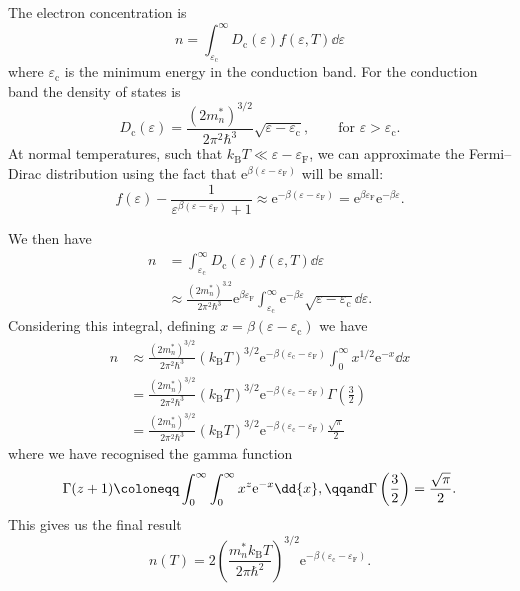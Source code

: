 \documentclass[fleqn]{NotesClass}
\newcommand*{\boltzmann}{k_{\mathrm{B}}}
\newcommand*{\e}{\mathrm{e}}
\newcommand*{\fermi}{\mathrm{F}}
\begin{document}
    The electron concentration is
    \begin{equation}
        n = \int_{\varepsilon_{\mathrm{c}}}^{\infty} D_{\mathrm{c}}(\varepsilon) f(\varepsilon, T) \dd{\varepsilon}
    \end{equation}
    where \(\varepsilon_{\mathrm{c}}\) is the minimum energy in the conduction band.
    For the conduction band the density of states is
    \begin{equation}
        D_{\mathrm{c}}(\varepsilon) = \frac{(2m_n^*)^{3/2}}{2\pi^2\hbar^3}\sqrt{\varepsilon - \varepsilon_{\mathrm{c}}}, \qquad\text{for \(\varepsilon > \varepsilon_{\mathrm{c}}\)}.
    \end{equation}
    At normal temperatures, such that \(\boltzmann T \ll \varepsilon - \varepsilon_{\fermi}\), we can approximate the Fermi--Dirac distribution using the fact that \(\e^{\beta(\varepsilon - \varepsilon_{\fermi})}\) will be small:
    \begin{equation}
        f(\varepsilon) - \frac{1}{\varepsilon^{\beta(\varepsilon - \varepsilon_{\fermi})} + 1} \approx \e^{-\beta(\varepsilon - \varepsilon_{\fermi})} = \e^{\beta\varepsilon_{\fermi}}\e^{-\beta \varepsilon}.
    \end{equation}
    
    We then have
    \begin{align}
        n &= \int_{\varepsilon_{\mathrm{c}}}^{\infty} D_{\mathrm{c}}(\varepsilon)f(\varepsilon, T) \dd{\varepsilon}\\
        &\approx \frac{(2m_n^*)^{3.2}}{2\pi^2\hbar^3} \e^{\beta\varepsilon_{\fermi}} \int_{\varepsilon_{\mathrm{c}}}^{\infty} \e^{-\beta\varepsilon}\sqrt{\varepsilon - \varepsilon_{\mathrm{c}}} \dd{\varepsilon}.
    \end{align}
    Considering this integral, defining \(x = \beta(\varepsilon - \varepsilon_{\mathrm{c}})\) we have
    \begin{align}
        n &\approx \frac{(2m_n^*)^{3/2}}{2\pi^2\hbar^3}(\boltzmann T)^{3/2} \e^{-\beta(\varepsilon_{\mathrm{c}} - \varepsilon_{\fermi})} \int_{0}^{\infty} x^{1/2} \e^{-x}\dd{x}\\
        &= \frac{(2m_n^*)^{3/2}}{2\pi^2\hbar^3}(\boltzmann T)^{3/2} \e^{-\beta(\varepsilon_{\mathrm{c}} - \varepsilon_{\fermi})} \Gamma\left( \frac{3}{2} \right)\\
        &= \frac{(2m_n^*)^{3/2}}{2\pi^2\hbar^3}(\boltzmann T)^{3/2} \e^{-\beta(\varepsilon_{\mathrm{c}} - \varepsilon_{\fermi})} \frac{\sqrt{\pi}}{2}
    \end{align}
    where we have recognised the gamma function
    \begin{equation}
        \Gamma(z+1) \coloneqq \int_{0}^{\infty} \int_{0}^{\infty} x^{z}\e^{-x} \dd{x}, \qqand \Gamma\left( \frac{3}{2} \right) = \frac{\sqrt{\pi}}{2}.
    \end{equation}
    This gives us the final result
    \begin{equation}
        n(T) = 2\left( \frac{m_n^*\boltzmann T}{2\pi\hbar^2} \right)^{3/2} \e^{-\beta(\varepsilon_{\mathrm{c}} - \varepsilon_{\mathrm{F}})}.
    \end{equation}
    
\end{document}

